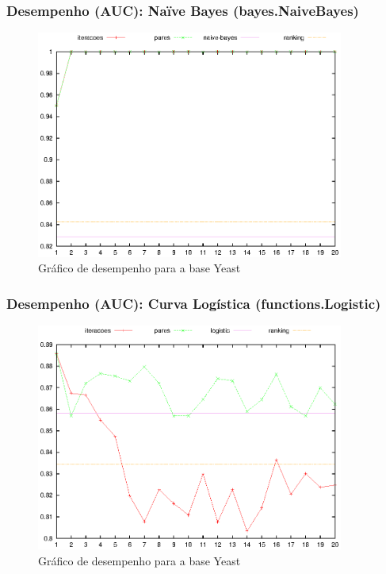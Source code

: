 \begin{frame}
    \frametitle{Desempenho (AUC): Naïve Bayes (bayes.NaiveBayes)}

    \begin{figure}[H]
        \centering
        \includegraphics[width=0.9\textwidth]{img/yeast_naive-bayes.eps}
        \caption{Gráfico de desempenho para a base Yeast}
    \end{figure}
\end{frame}

\begin{frame}
    \frametitle{Desempenho (AUC): Curva Logística (functions.Logistic)}

    \begin{figure}[H]
        \centering
        \includegraphics[width=0.9\textwidth]{img/yeast_logistic.eps}
        \caption{Gráfico de desempenho para a base Yeast}
    \end{figure}
\end{frame}

